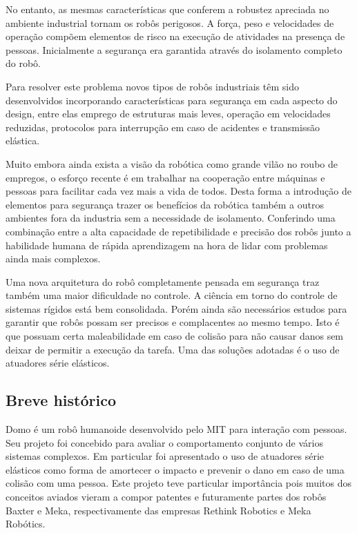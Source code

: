 No entanto, as mesmas características que conferem a robustez apreciada no ambiente industrial tornam os robôs perigosos. A força, peso e velocidades de operação compõem elementos de risco na execução de atividades na presença de pessoas. Inicialmente a segurança era garantida através do isolamento completo do robô.

Para resolver este problema novos tipos de robôs industriais têm sido desenvolvidos incorporando características para segurança em cada aspecto do design, entre elas emprego de estruturas mais leves, operação em velocidades reduzidas, protocolos para interrupção em caso de acidentes e transmissão elástica. \cite{nobody}

Muito embora ainda exista a visão da robótica como grande vilão no roubo de empregos, o esforço recente é em trabalhar na cooperação entre máquinas e pessoas para facilitar cada vez mais a vida de todos. \cite{nobody} Desta forma a introdução de elementos para segurança trazer os benefícios da robótica também a outros ambientes fora da industria sem a necessidade de isolamento. Conferindo uma combinação entre a alta capacidade de repetibilidade e precisão dos robôs junto a habilidade humana de rápida aprendizagem na hora de lidar com problemas ainda mais complexos.

Uma nova arquitetura do robô completamente pensada em segurança traz também uma maior dificuldade no controle. A ciência em torno do controle de sistemas rígidos está bem consolidada. Porém ainda são necessários estudos para garantir que robôs possam ser precisos e complacentes ao mesmo tempo. Isto é que possuam certa maleabilidade em caso de colisão para não causar danos sem deixar de permitir a execução da tarefa. Uma das soluções adotadas é o uso de atuadores série elásticos.



\subsection{Breve histórico}


Domo é um robô humanoide desenvolvido pelo MIT para interação com pessoas. Seu projeto foi concebido para avaliar o comportamento conjunto de vários sistemas complexos. Em particular foi apresentado o uso de atuadores série elásticos como forma de amortecer o impacto e prevenir o dano em caso de uma colisão com uma pessoa. Este projeto teve particular importância pois muitos dos conceitos aviados vieram a compor patentes e futuramente partes dos robôs Baxter e Meka, respectivamente das empresas Rethink Robotics e Meka Robótics. 

